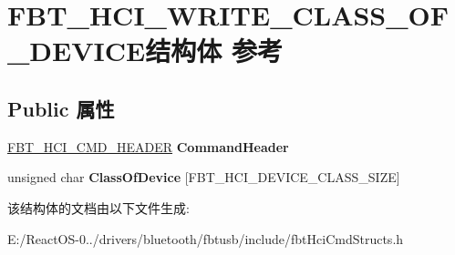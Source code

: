 \hypertarget{struct_f_b_t___h_c_i___w_r_i_t_e___c_l_a_s_s___o_f___d_e_v_i_c_e}{}\section{F\+B\+T\+\_\+\+H\+C\+I\+\_\+\+W\+R\+I\+T\+E\+\_\+\+C\+L\+A\+S\+S\+\_\+\+O\+F\+\_\+\+D\+E\+V\+I\+C\+E结构体 参考}
\label{struct_f_b_t___h_c_i___w_r_i_t_e___c_l_a_s_s___o_f___d_e_v_i_c_e}
\subsection*{Public 属性}
\begin{DoxyCompactItemize}
\item 
\mbox{\label{struct_f_b_t___h_c_i___w_r_i_t_e___c_l_a_s_s___o_f___d_e_v_i_c_e_ab913d817a387d5eaf82681f239b5fe45}} 
\hyperlink{struct_f_b_t___h_c_i___c_m_d___h_e_a_d_e_r}{F\+B\+T\+\_\+\+H\+C\+I\+\_\+\+C\+M\+D\+\_\+\+H\+E\+A\+D\+ER} {\bfseries Command\+Header}
\item 
\mbox{\label{struct_f_b_t___h_c_i___w_r_i_t_e___c_l_a_s_s___o_f___d_e_v_i_c_e_a5191539cbff88022f144e6a9fa304c32}} 
unsigned char {\bfseries Class\+Of\+Device} \mbox{[}F\+B\+T\+\_\+\+H\+C\+I\+\_\+\+D\+E\+V\+I\+C\+E\+\_\+\+C\+L\+A\+S\+S\+\_\+\+S\+I\+ZE\mbox{]}
\end{DoxyCompactItemize}


该结构体的文档由以下文件生成\+:\begin{DoxyCompactItemize}
\item 
E\+:/\+React\+O\+S-\/0../drivers/bluetooth/fbtusb/include/fbt\+Hci\+Cmd\+Structs.\+h\end{DoxyCompactItemize}
